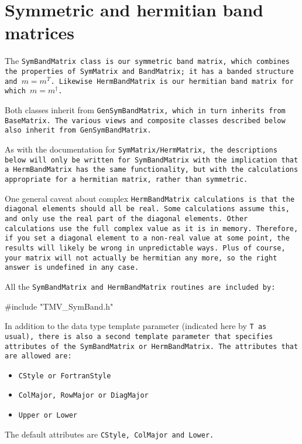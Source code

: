 
\section{Symmetric and hermitian band matrices}
\label{SymBandMatrix}

The \tt{SymBandMatrix} class is our symmetric band matrix, which combines
the properties of SymMatrix and BandMatrix; it has a banded structure and
$m = m^T$.  Likewise \tt{HermBandMatrix} is our hermitian band matrix for
which $m = m^\dagger$.

Both classes inherit from \tt{GenSymBandMatrix}, which in turn inherits from 
\tt{BaseMatrix}.  The various views and composite classes described below 
also inherit from \tt{GenSymBandMatrix}.

As with the documentation for \tt{SymMatrix}/\tt{HermMatrix}, the descriptions
below will only be written for \tt{SymBandMatrix} with the implication
that a \tt{HermBandMatrix} has the same functionality, but with the calculations
appropriate for a hermitian matrix, rather than symmetric.

One general caveat about complex \tt{HermBandMatrix} calculations is that 
the diagonal elements should all be real.  Some calculations assume this, and 
only use the real part of the diagonal elements.  Other calculations use the 
full complex value as it is in memory.  Therefore, if you set a diagonal element
to a non-real value at some point, the results will likely be wrong in 
unpredictable ways.  Plus of course, your matrix will not actually be 
hermitian any more, so the right answer is undefined in any case.

All the \tt{SymBandMatrix} and \tt{HermBandMatrix} routines are included by:
\begin{tmvcode}
#include "TMV_SymBand.h"
\end{tmvcode}

In addition to the data type template parameter (indicated here by \tt{T} as usual),
there is also a second template parameter that specifies attributes of the
\tt{SymBandMatrix} or \tt{HermBandMatrix}.  The attributes that are allowed are:
\begin{itemize}
\item \tt{CStyle} or \tt{FortranStyle}
\item \tt{ColMajor}, \tt{RowMajor} or \tt{DiagMajor}
\item \tt{Upper} or \tt{Lower}
\end{itemize}
The default attributes are \tt{CStyle}, \tt{ColMajor} and \tt{Lower}.

